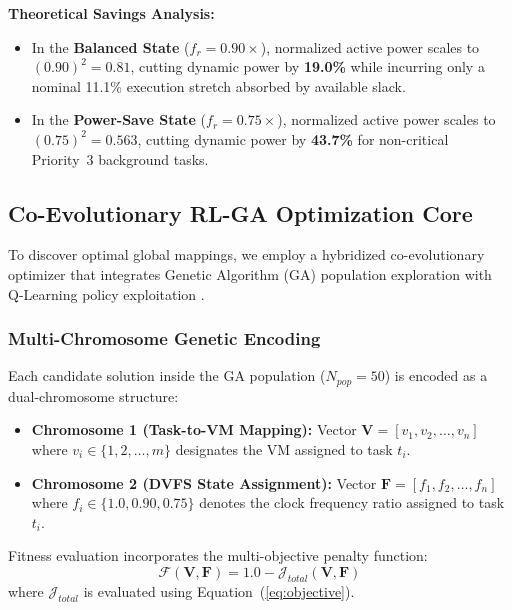\documentclass[default,sn-mathphys-num]{sn-jnl}
\theoremstyle{thmstyleone}
\theoremstyle{thmstyletwo}
\theoremstyle{thmstylethree}
\begin{document}
\noindent \textbf{Theoretical Savings Analysis:}
\begin{itemize}
    \item In the \textbf{Balanced State} ($f_r = 0.90\times$), normalized active power scales to $(0.90)^2 = 0.81$, cutting dynamic power by \textbf{19.0\%} while incurring only a nominal 11.1\% execution stretch absorbed by available slack.
    \item In the \textbf{Power-Save State} ($f_r = 0.75\times$), normalized active power scales to $(0.75)^2 = 0.563$, cutting dynamic power by \textbf{43.7\%} for non-critical Priority~3 background tasks.
\end{itemize}

\subsection{Co-Evolutionary RL-GA Optimization Core}
To discover optimal global mappings, we employ a hybridized co-evolutionary optimizer that integrates Genetic Algorithm (GA) population exploration with Q-Learning policy exploitation \cite{narsimhulu2026hybrid}.

\subsubsection{Multi-Chromosome Genetic Encoding}
Each candidate solution inside the GA population ($N_{pop} = 50$) is encoded as a dual-chromosome structure:
\begin{itemize}
    \item \textbf{Chromosome 1 (Task-to-VM Mapping):} Vector $\mathbf{V} = [v_1, v_2, \dots, v_n]$ where $v_i \in \{1, 2, \dots, m\}$ designates the VM assigned to task $t_i$.
    \item \textbf{Chromosome 2 (DVFS State Assignment):} Vector $\mathbf{F} = [f_1, f_2, \dots, f_n]$ where $f_i \in \{1.0, 0.90, 0.75\}$ denotes the clock frequency ratio assigned to task $t_i$.
\end{itemize}

Fitness evaluation incorporates the multi-objective penalty function:
\begin{equation}
\mathcal{F}(\mathbf{V}, \mathbf{F}) = 1.0 - \mathcal{J}_{total}(\mathbf{V}, \mathbf{F})
\end{equation}
where $\mathcal{J}_{total}$ is evaluated using Equation~(\ref{eq:objective}).
\end{document}

